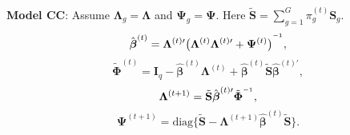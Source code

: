 \documentclass[12pt]{article}
\newcommand{\vecI}{\mathbf{I}}
\newcommand{\inv}{^{\raisebox{.2ex}{$\scriptscriptstyle-1$}}}
\begin{document}
\textbf{Model CC}: Assume $\mathbf{\Lambda}_g = \mathbf{\Lambda}$ and $\mathbf{\Psi}_g = \mathbf{\Psi}$. Here $\tilde{\mathbf{S}} = \sum_{g=1}^G \pi_g^{(t)} \mathbf{S}_g$.
\begin{equation*}
\hat{\boldsymbol{\beta}}^{(t)} = \mathbf{\Lambda}^{(t) \prime} \big(\mathbf{\Lambda}^{(t)} \mathbf{\Lambda}^{(t) \prime} + \mathbf{\Psi}^{(t)} \big)^{\inv},
\end{equation*}
\begin{equation*}
\tilde{\mathbf{\Phi}}^{(t)} = \vecI_q - \hat{\boldsymbol{\beta}}^{(t)} \mathbf{\Lambda}^{(t)} +  \hat{\boldsymbol{\beta}}^{(t)} \tilde{\mathbf{S}} \hat{\boldsymbol{\beta}}^{(t) \prime},
\end{equation*}
\begin{equation*}
\mathbf{\Lambda}^{(t+1)} = \tilde{\mathbf{S}} \hat{\boldsymbol{\beta}}^{(t) \prime} \tilde{\mathbf{\Phi}}^{\inv},
\end{equation*}
\begin{equation*}
\mathbf{\Psi}^{(t+1)} = \text{diag}\{\tilde{\mathbf{S}} - \mathbf{\Lambda}^{(t+1)}\hat{\boldsymbol{\beta}}^{(t)} \tilde{\mathbf{S}}\}.
\end{equation*}
\end{document}
